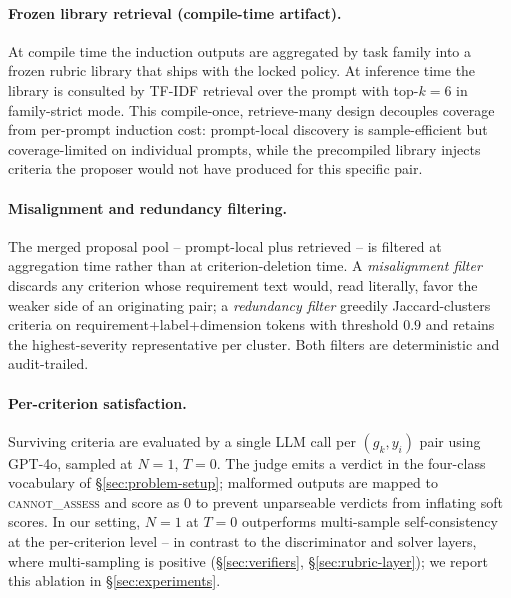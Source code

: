 \paragraph{Frozen library retrieval (compile-time artifact).}
At compile time the induction outputs are aggregated by task family
into a frozen rubric library that ships with the locked policy.  At
inference time the library is consulted by TF-IDF retrieval over the
prompt with top-$k{=}6$ in family-strict mode.  This compile-once,
retrieve-many design decouples coverage from per-prompt induction
cost: prompt-local discovery is sample-efficient but coverage-limited
on individual prompts, while the precompiled library injects criteria
the proposer would not have produced for this specific pair.

\paragraph{Misalignment and redundancy filtering.}
The merged proposal pool -- prompt-local plus retrieved -- is filtered
at aggregation time rather than at criterion-deletion time.  A
\emph{misalignment filter} discards any criterion whose requirement
text would, read literally, favor the weaker side of an originating
pair; a \emph{redundancy filter} greedily Jaccard-clusters criteria on
requirement+label+dimension tokens with threshold $0.9$ and retains
the highest-severity representative per cluster.  Both filters are
deterministic and audit-trailed.

\paragraph{Per-criterion satisfaction.}
Surviving criteria are evaluated by a single LLM call per
$(g_k, y_i)$ pair using GPT-4o, sampled at $N{=}1$, $T{=}0$.  The
judge emits a verdict in the four-class vocabulary of
\S\ref{sec:problem-setup}; malformed outputs are mapped to
\textsc{cannot\_assess} \citep{rao2026autorubric} and score as $0$ to
prevent unparseable verdicts from inflating soft scores.  In our
setting, $N{=}1$ at $T{=}0$ outperforms multi-sample self-consistency
at the per-criterion level -- in contrast to the discriminator and
solver layers, where multi-sampling is positive (\S\ref{sec:verifiers},
\S\ref{sec:rubric-layer}); we report this ablation in
\S\ref{sec:experiments}.


